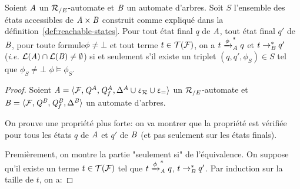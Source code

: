 \begin{lemma}
  Soient $\mathit A$ un ${\mathcal R_{/E}}$-automate et $\mathit B$ un automate d'arbres.
  Soit $S$ l'ensemble des états accessibles de $\mathit A\times \mathit B$ construit
  comme expliqué dans la définition~\ref{def:reachable-states}. 
  Pour tout état final $q$ de $\mathit A$, tout état final $q'$ de $\mathit B$, pour toute formule$\phi\neq \bot$ et
  tout terme $t\in\mathcal{T(F)}$, on a $t\xrightarrow{\phi}^*_\mathit A q$ et $t \rightarrow_\mathit B^* q'$
  (\textit{i.e.} $\mathcal{L}(\mathit A)\cap \mathcal{L}(\mathit B) \neq \emptyset$) si et seulement s'il existe un 
  triplet $(q,q',\phi_S)\in S$ tel que $\phi_S\neq\bot$ $\phi \models \phi_S$. 
\end{lemma}

\begin{proof}
  Soient $\mathit A =\langle \mathcal{F}, \mathit Q^\mathit A,\mathit Q^\mathit A_f,\Delta^\mathit A \cup \upvarepsilon_{\mathcal R} \cup \upvarepsilon_{=} \rangle$
  un ${\mathcal R_{/E}}$-automate et $\mathit B=\langle \mathcal{F}, \mathit Q^\mathit B,\mathit Q^\mathit B_f,\Delta^\mathit B \rangle$ un automate d'arbres.  


On prouve une propriété plus forte: on va montrer que la propriété est vérifiée pour tous les états $q$ de $\mathit A$ et $q'$ de $\mathit B$ 
(et pas seulement sur les états finals).

Premièrement, on montre la partie "seulement si" de l'équivalence.
On suppose qu'il 
existe un terme $t\in\mathcal{T(F)}$ tel que $t\xrightarrow{\phi}^*_\mathit A q$, $t \rightarrow_\mathit B^* q'$.
Par induction sur la taille de $t$, on a:


\end{proof}
